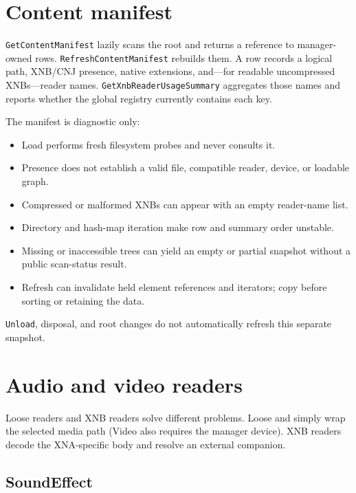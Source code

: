 \section{Content manifest}

\texttt{GetContentManifest} lazily scans the root and returns a reference to manager-owned rows.
\texttt{RefreshContentManifest} rebuilds them. A row records a logical path, XNB/CNJ presence,
native extensions, and---for readable uncompressed XNBs---reader names.
\texttt{GetXnbReaderUsageSummary} aggregates those names and reports whether the global registry
currently contains each key.

The manifest is diagnostic only:

\begin{itemize}
  \item Load performs fresh filesystem probes and never consults it.
  \item Presence does not establish a valid file, compatible reader, device, or loadable graph.
  \item Compressed or malformed XNBs can appear with an empty reader-name list.
  \item Directory and hash-map iteration make row and summary order unstable.
  \item Missing or inaccessible trees can yield an empty or partial snapshot without a public
        scan-status result.
  \item Refresh can invalidate held element references and iterators; copy before sorting or
        retaining the data.
\end{itemize}

\texttt{Unload}, disposal, and root changes do not automatically refresh this separate snapshot.

\section{Audio and video readers}
\label{sec:xnb-audio}

Loose readers and XNB readers solve different problems. Loose  and
 simply wrap the selected media path (Video also requires the manager device).
XNB readers decode the XNA-specific body and resolve an external companion.

\subsection{SoundEffect}

